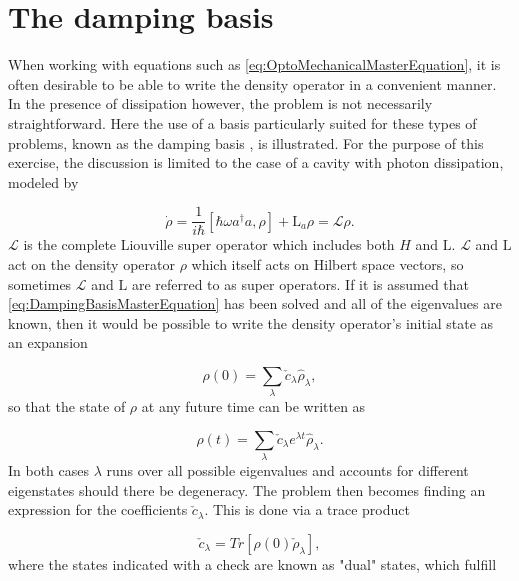\documentclass[12pt]{article}
\begin{document}
\section{The damping basis}

When working with equations such as \ref{eq:OptoMechanicalMasterEquation}, it is often desirable to be able to write the density operator in a convenient manner.  In the presence of dissipation however, the problem is not necessarily straightforward. Here the use of a basis particularly suited for these types of problems, known as the damping basis \cite{BriegelDampingBasis1993}, is illustrated. For the purpose of this exercise, the discussion is limited to the case of a cavity with photon dissipation, modeled by

\begin{equation}\label{eq:DampingBasisMasterEquation}
    \dot{\rho} = \frac{1}{i\hbar}[\hbar \omega a^\dagger a,\rho] +\mathrm{L}_a\rho = \mathcal{L}\rho.
\end{equation} $\mathcal{L}$ is the complete Liouville super operator which includes both $H$ and $\mathrm{L}$. $\mathcal{L}$ and $\mathrm{L}$ act on the density operator $\rho$ which itself acts on Hilbert space vectors, so sometimes $\mathcal{L}$ and $\mathrm{L}$ are referred to as super operators. If it is assumed that \ref{eq:DampingBasisMasterEquation} has been solved and all of the eigenvalues are known, then it would be possible to write the density operator's initial state as an expansion

\begin{equation}
    \rho(0) = \sum_{\lambda} \check{c}_{\lambda} \hat{\rho}_{\lambda}, 
\end{equation} so that the state of $\rho$ at any future time can be written as

\begin{equation}
    \rho(t) = \sum_{\lambda} \check{c}_{\lambda} e^{\lambda t}\hat{\rho}_{\lambda}. 
\end{equation} In both cases $\lambda$ runs over all possible eigenvalues and accounts for different eigenstates should there be degeneracy. The problem then becomes finding an expression for the coefficients $\check{c}_{\lambda}$. This is done via a trace product

\begin{equation}
    \check{c}_\lambda = Tr[\rho(0)\check{\rho}_\lambda],
\end{equation} where the states indicated with a check are known as "dual" states, which fulfill
\end{document}
